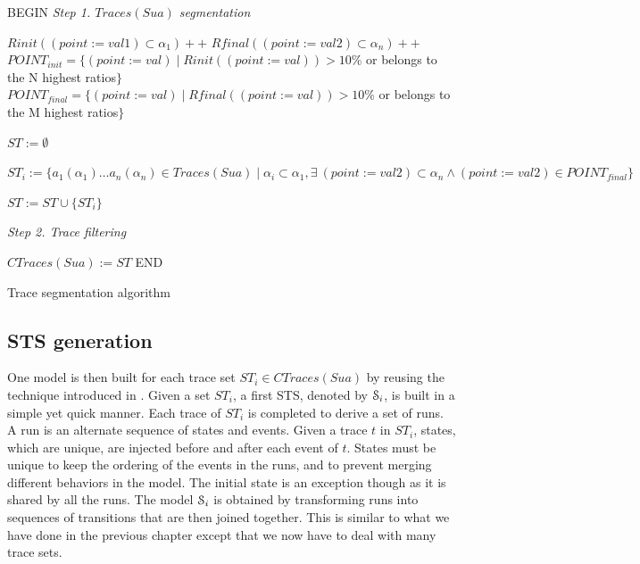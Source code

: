 \begin{algorithm}[h]


\BlankLine
BEGIN\;
\emph{Step 1. $Traces(Sua)$ segmentation}

 {
$Rinit((point:=val1)\subset \alpha_1)++$\;
$Rfinal((point:=val2)\subset \alpha_n)++$\;
}
$POINT_{init}=\{(point:=val) \mid Rinit((point:=val))>10$\% or belongs to the N highest ratios$\}$\;
$POINT_{final}=\{(point:=val) \mid Rfinal((point:=val))>10$\% or belongs to the M highest ratios$\}$\;
\BlankLine

$ST := \emptyset$\;
 {
	$ST_i := \{a_1(\alpha_1) \dots a_n(\alpha_n)\in Traces(Sua) \mid
	\alpha_i\subset \alpha_1, \exists ~(point:=val2) \subset
\alpha_n \wedge (point:=val2) \in POINT_{final}    \}$\;

    $ST := ST \cup \{ ST_i \}$\;
}

\BlankLine
\emph{Step 2. Trace filtering}

 {
}

$CTraces(Sua) := ST$\;
END\;

\caption{Trace segmentation algorithm}
\label{algo_traces}
\end{algorithm}

\subsection{STS generation}
\label{sec:modelinf:prodsystems:generation}

One model is then built for each trace set $ST_i \in
CTraces(Sua)$ by reusing the technique introduced in
.
Given a set $ST_i$, a first STS, denoted by $\EuScript{S}_i$, is
built in a simple yet quick manner. Each trace of $ST_i$ is
completed to derive a set of runs. A run is an alternate sequence
of states and events. Given a trace $t$ in $ST_i$, states, which
are unique, are injected before and after each event of $t$.
States must be unique to keep the ordering of the events in the
runs, and to prevent merging different behaviors in the model.
The initial state is an exception though as it is shared by all
the runs. The model $\EuScript{S}_i$ is obtained by transforming
runs into sequences of transitions that are then joined together.
This is similar to what we have done in the previous chapter
except that we now have to deal with many trace sets.

